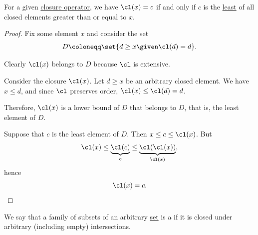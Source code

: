 \begin{proposition}\label{thm:closure_operator_minimality}
  For a given \hyperref[def:abstract_closure_operator]{closure operator}, we have \( \cl(x) = c \) if and only if \( c \) is the \hyperref[def:extremal_points/maximum_and_minimum]{least} of all closed elements greater than or equal to \( x \).
\end{proposition}
\begin{proof}
  Fix some element \( x \) and consider the set
  \begin{equation*}
    D \coloneqq \set{ d \geq x \given \cl(d) = d }.
  \end{equation*}

  Clearly \( \cl(x) \) belongs to \( D \) because \( \cl \) is extensive.

  \SufficiencySubProof Consider the closure \( \cl(x) \). Let \( d \geq x \) be an arbitrary closed element. We have \( x \leq d \), and since \( \cl \) preserves order, \( \cl(x) \leq \cl(d) = d \).

  Therefore, \( \cl(x) \) is a lower bound of \( D \) that belongs to \( D \), that is, the least element of \( D \).

  \NecessitySubProof Suppose that \( c \) is the least element of \( D \). Then \( x \leq c \leq \cl(x) \). But
  \begin{equation*}
    \cl(x) \leq \underbrace{\cl(c)}_{c} \leq \underbrace{\cl(\cl(x))}_{\cl(x)},
  \end{equation*}
  hence
  \begin{equation*}
    \cl(x) = c.
  \end{equation*}
\end{proof}

\begin{definition}\label{def:moore_family}
  We say that a family of subsets of an arbitrary \hyperref[def:set]{set} is a  if it is closed under arbitrary (including empty) intersections.
\end{definition}

